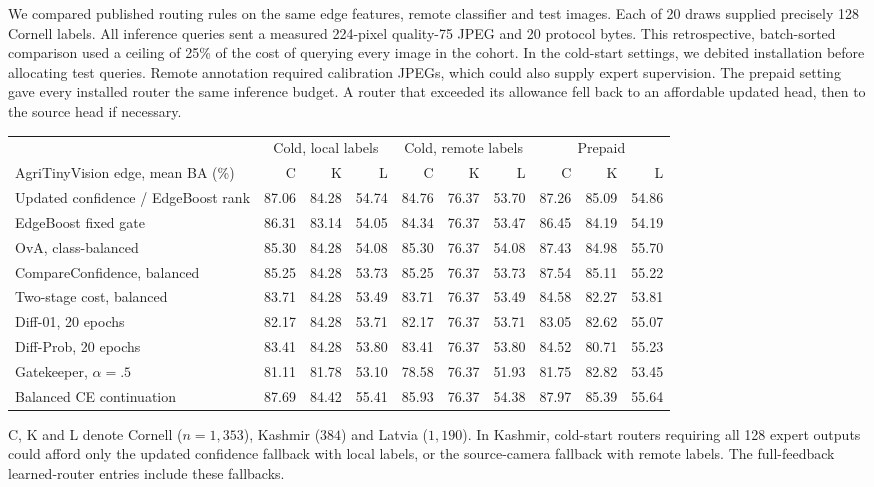 We compared published routing rules on the same edge features, remote classifier and test images. Each of 20 draws supplied precisely 128 Cornell labels. All inference queries sent a measured 224-pixel quality-75 JPEG and 20 protocol bytes. This retrospective, batch-sorted comparison used a ceiling of 25\% of the cost of querying every image in the cohort. In the cold-start settings, we debited installation before allocating test queries. Remote annotation required calibration JPEGs, which could also supply expert supervision. The prepaid setting gave every installed router the same inference budget. A router that exceeded its allowance fell back to an affordable updated head, then to the source head if necessary.

\begin{center}\begingroup\footnotesize\setlength{\tabcolsep}{2.8pt}
\begin{tabular}{@{}lrrrrrrrrr@{}}\toprule
&\multicolumn{3}{c}{Cold, local labels}&\multicolumn{3}{c}{Cold, remote labels}&\multicolumn{3}{c}{Prepaid}\\
\cmidrule(lr){2-4}\cmidrule(lr){5-7}\cmidrule(lr){8-10}
AgriTinyVision edge, mean BA (\%) & C & K & L & C & K & L & C & K & L\\\midrule
Updated confidence / EdgeBoost rank&87.06&84.28&54.74&84.76&76.37&53.70&87.26&85.09&54.86\\
EdgeBoost fixed gate&86.31&83.14&54.05&84.34&76.37&53.47&86.45&84.19&54.19\\
OvA, class-balanced&85.30&84.28&54.08&85.30&76.37&54.08&87.43&84.98&55.70\\
CompareConfidence, balanced&85.25&84.28&53.73&85.25&76.37&53.73&87.54&85.11&55.22\\
Two-stage cost, balanced&83.71&84.28&53.49&83.71&76.37&53.49&84.58&82.27&53.81\\
Diff-01, 20 epochs&82.17&84.28&53.71&82.17&76.37&53.71&83.05&82.62&55.07\\
Diff-Prob, 20 epochs&83.41&84.28&53.80&83.41&76.37&53.80&84.52&80.71&55.23\\
Gatekeeper, $\alpha=.5$&81.11&81.78&53.10&78.58&76.37&51.93&81.75&82.82&53.45\\
Balanced CE continuation&87.69&84.42&55.41&85.93&76.37&54.38&87.97&85.39&55.64\\
\bottomrule\end{tabular}\endgroup\end{center}
{\footnotesize C, K and L denote Cornell ($n=1{,}353$), Kashmir ($384$) and Latvia ($1{,}190$). In Kashmir, cold-start routers requiring all 128 expert outputs could afford only the updated confidence fallback with local labels, or the source-camera fallback with remote labels. The full-feedback learned-router entries include these fallbacks.\par}

